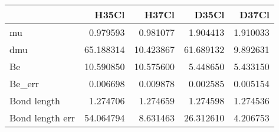 \begin{tabular}{lrrrr}
\toprule
{} &      H35Cl &      H37Cl &      D35Cl &     D37Cl \\
\midrule
mu              &   0.979593 &   0.981077 &   1.904413 &  1.910033 \\
dmu             &  65.188314 &  10.423867 &  61.689132 &  9.892631 \\
Be              &  10.590850 &  10.575600 &   5.448650 &  5.433150 \\
Be\_err          &   0.006698 &   0.009878 &   0.002585 &  0.005154 \\
Bond length     &   1.274706 &   1.274659 &   1.274598 &  1.274536 \\
Bond length err &  54.064794 &   8.631463 &  26.312610 &  4.206753 \\
\bottomrule
\end{tabular}
